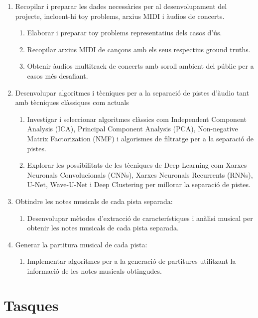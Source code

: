 ﻿\documentclass[10pt,a4paper,twocolumn,twoside]{article}
\begin{document}
\begin{enumerate}
    \item Recopilar i preparar les dades necessàries per al desenvolupament del projecte, incloent-hi toy problems, arxius MIDI i àudios de concerts.
    \begin{enumerate}
        \item Elaborar i preparar toy problems representatius dels casos d'ús.
        \item Recopilar arxius MIDI de cançons amb els seus respectius ground truths.
        \item Obtenir àudios multitrack de concerts amb soroll ambient del públic per a casos més desafiant.
    \end{enumerate}
    \item Desenvolupar algoritmes i tècniques per a la separació de pistes d'àudio tant amb tècniques clàssiques com actuals 
    \begin{enumerate}
        \item Investigar i seleccionar algoritmes clàssics com Independent Component Analysis (ICA), Principal Component Analysis (PCA), Non-negative Matrix Factorization (NMF) i algorismes de filtratge per a la separació de pistes.
        \item Explorar les possibilitats de les tècniques de Deep Learning com Xarxes Neuronals Convolucionals (CNNs), Xarxes Neuronals Recurrents (RNNs), U-Net, Wave-U-Net i Deep Clustering per millorar la separació de pistes.
    \end{enumerate}
    \item Obtindre les notes musicals de cada pista separada:
    \begin{enumerate}
        \item Desenvolupar mètodes d'extracció de característiques i anàlisi musical per obtenir les notes musicals de cada pista separada.
    \end{enumerate}
    \item Generar la partitura musical de cada pista:
    \begin{enumerate}
        \item Implementar algoritmes per a la generació de partitures utilitzant la informació de les notes musicals obtingudes.
    \end{enumerate}
\end{enumerate}

\section{Tasques}
\label{sec:tasques}
\end{document}
